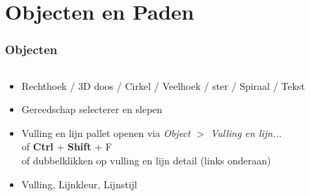 \documentclass[t]{beamer}
\begin{document}
	\section{Objecten en Paden}
	\begin{frame}
		\frametitle{Objecten}
		\begin{columns}
			\begin{column}[T]{0.6\textwidth}
				\begin{itemize}
					\item Rechthoek / 3D doos / Cirkel / Veelhoek / ster / Spiraal / Tekst
					\item Gereedschap selecterer en slepen
				\end{itemize}
				\begin{itemize}
					\item Vulling en lijn pallet openen via \emph{Object $>$ Vulling en lijn...}\\
					 of \textbf{Ctrl} + \textbf{Shift} + F\\
					 of dubbelklikken op vulling en lijn detail (links onderaan)
					\item Vulling, Lijnkleur, Lijnstijl
				\end{itemize}
			\end{column}
			\begin{column}[T]{0.4\textwidth}

\end{column}
\end{columns}
\end{frame}
\end{document}
